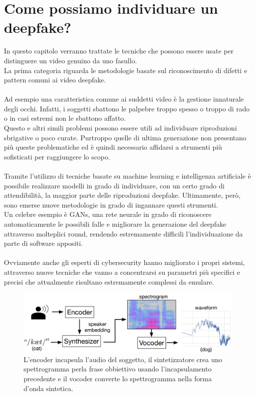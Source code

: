 \documentclass[12pt, a4paper]{article}
\begin{document}
\section{Come possiamo individuare un deepfake?}
In questo capitolo verranno trattate le tecniche che possono essere usate per distinguere un video genuino da uno fasullo.\\ La prima categoria riguarda le metodologie basate sul riconoscimento di difetti e pattern comuni ai video deepfake.\\\\
Ad esempio una caratteristica comune ai suddetti video è la gestione innaturale degli occhi. Infatti, i soggetti sbattono le palpebre troppo spesso o troppo di rado o in casi estremi non le sbattono affatto.\\
Questo e altri simili problemi possono essere utili ad individuare riproduzioni sbrigative o poco curate. Purtroppo quelle di ultima generazione non presentano più queste problematiche ed è quindi necessario affidarsi a strumenti più sofisticati per raggiungere lo scopo.\\\\
Tramite l'utilizzo di tecniche basate su machine learning e intelligenza artificiale è possibile realizzare modelli in grado di individuare, con un certo grado di attendibilità, la maggior parte delle riproduzioni deepfake. Ultimamente, però, sono emerse nuove metodologie in grado di ingannare questi strumenti.\\
Un celebre esempio è GANs, una rete neurale in grado di riconoscere automaticamente le possibili falle e migliorare la generazione del deepfake attraverso molteplici round, rendendo estremamente difficili l'individuazione da parte di software appositi.\\\\
Ovviamente anche gli esperti di cybersecurity hanno migliorato i propri sistemi, attraverso nuove tecniche che vanno a concentrarsi su parametri più specifici e precisi che attualmente risultano estremamente complessi da emulare.\\
\begin{figure}
\includegraphics[width=1\linewidth]{img/waveform.png}
\caption{L'encoder incapsula l'audio del soggetto, il sintetizzatore crea uno spettrogramma perla frase obbiettivo usando l'incapsulamento precedente e il vocoder converte lo spettrogramma nella forma d'onda sintetica.}
\label{fig2:wrapfig}
\end{figure}
\end{document}
